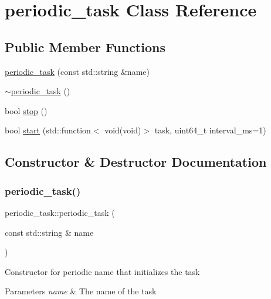 \hypertarget{classperiodic__task}{}\section{periodic\+\_\+task Class Reference}
\label{classperiodic__task}
\subsection*{Public Member Functions}
\begin{DoxyCompactItemize}
\item 
\hyperlink{classperiodic__task_a9290dc74dd438153930c1fa806fc9f43}{periodic\+\_\+task} (const std\+::string \&name)
\item 
\hyperlink{classperiodic__task_a48e0b41236097af64f4591f3e270a70f}{$\sim$periodic\+\_\+task} ()
\item 
bool \hyperlink{classperiodic__task_a3e9de732bfaf096cb4f83a8813958f5a}{stop} ()
\item 
bool \hyperlink{classperiodic__task_a17829d0796787612e33a912f7f1188af}{start} (std\+::function$<$ void(void)$>$ task, uint64\+\_\+t interval\+\_\+ms=1)
\end{DoxyCompactItemize}


\subsection{Constructor \& Destructor Documentation}
\mbox{\label{classperiodic__task_a9290dc74dd438153930c1fa806fc9f43}} 
\subsubsection{\texorpdfstring{periodic\+\_\+task()}{periodic\_task()}}
{\footnotesize\ttfamily periodic\+\_\+task\+::periodic\+\_\+task (\begin{DoxyParamCaption}\item[{const std\+::string \&}]{name }\end{DoxyParamCaption})\hspace{0.3cm}{\ttfamily [inline]}}

Constructor for periodic name that initializes the task 
\begin{DoxyParams}{Parameters}
{\em name} & The name of the task \\
\hline
\end{DoxyParams}
\mbox{\label{classperiodic__task_a48e0b41236097af64f4591f3e270a70f}} 
